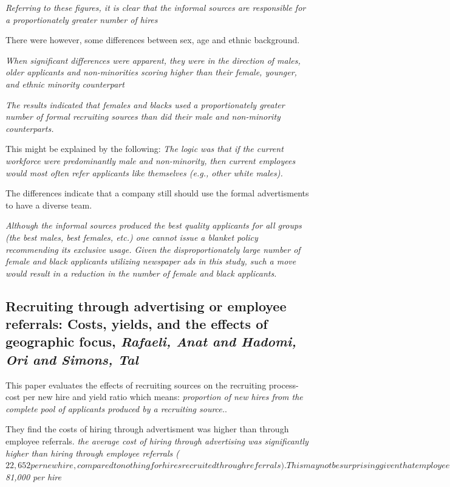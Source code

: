 \documentclass[a4paper, 11pt]{article} %
\begin{document}
\emph{Referring to these figures, it is clear that the informal sources are
responsible for a proportionately greater number of hires }

There were however, some differences between sex, age and ethnic background. 

\emph{When significant differences were apparent, they were in
the direction of males, older applicants and non-minorities scoring higher
than their female, younger, and ethnic minority counterpart}

\emph{The results indicated that females and blacks
used a proportionately greater number of formal recruiting sources than did
their male and non-minority counterparts.}

This might be explained by the following:
\emph{The logic was that if the current workforce were
predominantly male and non-minority, then current employees would most
often refer applicants like themselves (e.g., other white males).}

The differences indicate that a company still should use the formal advertisments to have a diverse team. 

\emph{Although
the informal sources produced the best quality applicants for all groups (the
best males, best females, etc.) one cannot issue a blanket policy recommending its exclusive usage. Given the disproportionately large number
of female and black applicants utilizing newspaper ads in this study, such
a move would result in a reduction in the number of female and black
applicants.}


\subsection*{Recruiting through advertising or employee referrals: Costs, yields, and the effects of geographic focus, \emph{Rafaeli, Anat and Hadomi, Ori and Simons, Tal} \cite{eleventh}}
This paper evaluates the effects of recruiting sources on the recruiting process-cost per new hire and yield ratio which means: \emph{proportion of new hires from the complete pool of applicants produced by a
recruiting source.}.

They find the costs of hiring through advertisment was higher than through employee referrals.
\emph{the average cost of hiring through advertising was
signiﬁcantly higher than hiring through employee referrals ($22,652 per new
hire, compared to nothing for hires recruited through referrals). This may
not be surprising given that employee referrals are cost-free, yet the average
cost of recruiting employees through national advertising is a striking
$81,000 per hire}
\end{document}
